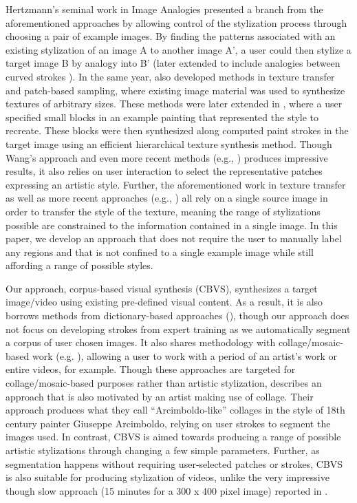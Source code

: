 \documentclass[a4paper,11pt,final]{ThesisStyle}
\begin{document}
Hertzmann's seminal work in Image Analogies \cite{Hertzmann2001} presented a branch from the aforementioned approaches by allowing control of the stylization process through choosing a pair of example images.  By finding the patterns associated with an existing stylization of an image A to another image A', a user could then stylize a target image B by analogy into B' (later extended to include analogies between curved strokes \cite{Hertzmann2002}).  In the same year, \cite{Efros2001,Liang2001a} also developed methods in texture transfer and patch-based sampling, where existing image material was used to synthesize textures of arbitrary sizes.  These methods were later extended in \cite{Wang2004a}, where a user specified small blocks in an example painting that represented the style to recreate.  These blocks were then synthesized along computed paint strokes in the target image using an efficient hierarchical texture synthesis method.  Though Wang's approach and even more recent methods (e.g., \cite{Guo2006}) produces impressive results, it also relies on user interaction to select the representative patches expressing an artistic style.  Further, the aforementioned work in texture transfer as well as more recent approaches (e.g., \cite{Lee2010}) all rely on a single source image in order to transfer the style of the texture, meaning the range of stylizations possible are constrained to the information contained in a single image.  In this paper, we develop an approach that does not require the user to manually label any regions and that is not confined to a single example image while still affording a range of possible styles.  

Our approach, corpus-based visual synthesis (CBVS), synthesizes a target image/video using existing pre-defined visual content.  As a result, it is also borrows methods from dictionary-based approaches (\cite{Zeng2009,Healey2004}), though our approach does not focus on developing strokes from expert training as we automatically segment a corpus of user chosen images.  It also shares methodology with collage/mosaic-based work (e.g. \cite{Kim2002,Orchard2008,Huang2011a,Miller2012}), allowing a user to work with a period of an artist's work or entire videos, for example.  Though these approaches are targeted for collage/mosaic-based purposes rather than artistic stylization, \cite{Huang2011a} describes an approach that is also motivated by an artist making use of collage.  Their approach produces what they call ``Arcimboldo-like'' collages in the style of 18th century painter Giuseppe Arcimboldo, relying on user strokes to segment the images used.  In contrast, CBVS is aimed towards producing a range of possible artistic stylizations through changing a few simple parameters.  Further, as segmentation happens without requiring user-selected patches or strokes, CBVS is also suitable for producing stylization of videos, unlike the very impressive though slow approach (15 minutes for a 300 x 400 pixel image) reported in \cite{Chang2010}.
\end{document}
